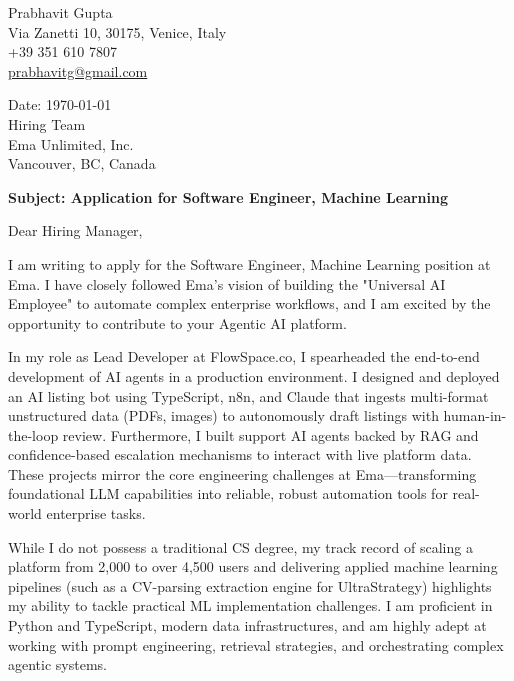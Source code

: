 \documentclass[11pt,a4paper]{article}
\begin{document}
\pagestyle{empty}

\begin{flushright}
    Prabhavit Gupta \\
    Via Zanetti 10, 30175, Venice, Italy \\
    +39 351 610 7807 \\
    \href{mailto:prabhavitg@gmail.com}{prabhavitg@gmail.com}
\end{flushright}

\vspace{2em}

\noindent Date: \today \\
\noindent Hiring Team \\
\noindent Ema Unlimited, Inc. \\
\noindent Vancouver, BC, Canada

\vspace{1.5em}

\noindent \textbf{Subject: Application for Software Engineer, Machine Learning}

\vspace{1.5em}

\noindent Dear Hiring Manager,

\vspace{1em}
\noindent I am writing to apply for the Software Engineer, Machine Learning position at Ema. I have closely followed Ema's vision of building the "Universal AI Employee" to automate complex enterprise workflows, and I am excited by the opportunity to contribute to your Agentic AI platform. 

\vspace{1em}
\noindent In my role as Lead Developer at FlowSpace.co, I spearheaded the end-to-end development of AI agents in a production environment. I designed and deployed an AI listing bot using TypeScript, n8n, and Claude that ingests multi-format unstructured data (PDFs, images) to autonomously draft listings with human-in-the-loop review. Furthermore, I built support AI agents backed by RAG and confidence-based escalation mechanisms to interact with live platform data. These projects mirror the core engineering challenges at Ema---transforming foundational LLM capabilities into reliable, robust automation tools for real-world enterprise tasks.

\vspace{1em}
\noindent While I do not possess a traditional CS degree, my track record of scaling a platform from 2,000 to over 4,500 users and delivering applied machine learning pipelines (such as a CV-parsing extraction engine for UltraStrategy) highlights my ability to tackle practical ML implementation challenges. I am proficient in Python and TypeScript, modern data infrastructures, and am highly adept at working with prompt engineering, retrieval strategies, and orchestrating complex agentic systems.
\end{document}
